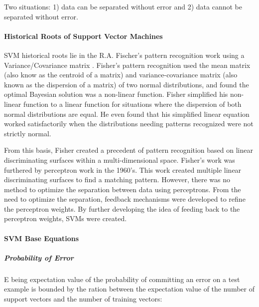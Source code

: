 		Two situations: 1) data can be separated without error and 2) data cannot be separated without error.

			\paragraph{Historical Roots of Support Vector Machines}
			SVM historical roots lie in the R.A. Fischer's pattern recognition work using a Variance/Covariance matrix \cite{fisher_use_1936}.  Fisher's pattern recognition used the mean matrix (also know as the centroid of a matrix) and  variance-covariance matrix (also known as the dispersion of a matrix) of two normal distributions, and found the optimal Bayesian solution was a non-linear function.  Fisher simplified his non-linear function to a linear function for situations where the dispersion of both normal distributions are equal.  He even found that his simplified linear equation worked satisfactorily when the distributions needing patterns recognized were not strictly normal.



			From this basis, Fisher created a precedent of pattern recognition based on linear discriminating surfaces within a multi-dimensional space.  Fisher's work was furthered by perceptron work in the 1960's.  This work created multiple linear discriminating surfaces to find a matching pattern.  However, there was no method to optimize the separation between data using perceptrons.  From the need to optimize the separation, feedback mechanisms were developed to refine the perceptron weights. By further developing the idea of feeding back to the perceptron weights, SVMs were created.

			\paragraph{SVM Base Equations}
				\subparagraph {Probability of Error} E being expectation value of the probability of committing an error on a test example is bounded by the ration between the expectation value of the number of support vectors and the number of training vectors:

